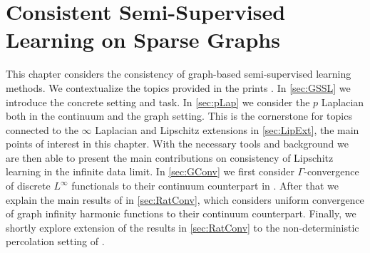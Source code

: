 \chapter{Consistent Semi-Supervised Learning on Sparse Graphs}\label{ch:SSL}

This chapter considers the consistency of graph-based semi-supervised learning methods. We contextualize the topics provided in the prints \cite{roith2022continuum, bungert2021uniform, bungert2022ratio}. In \cref{sec:GSSL} we introduce the concrete setting and task. In \cref{sec:pLap} we consider the $p$ Laplacian both in the continuum and the graph setting. This is the cornerstone for topics connected to the $\infty$ Laplacian and Lipschitz extensions in \cref{sec:LipExt}, the main points of interest in this chapter. With the necessary tools and background we are then able to present the main contributions on consistency of Lipschitz learning in the infinite data limit. In \cref{sec:GConv} we first consider $\Gamma$-convergence of discrete $L^\infty$ functionals to their continuum counterpart in \cite{roith2022continuum}. After that we explain the main results of \cite{bungert2021uniform} in \cref{sec:RatConv}, which considers uniform convergence of graph infinity harmonic functions to their continuum counterpart. Finally, we shortly explore extension of the results in \cref{sec:RatConv} to the non-deterministic percolation setting of  \cite{bungert2022ratio}.
%
%
%
\begin{center}%
\end{center}
%
%
%
%
%
%
%
